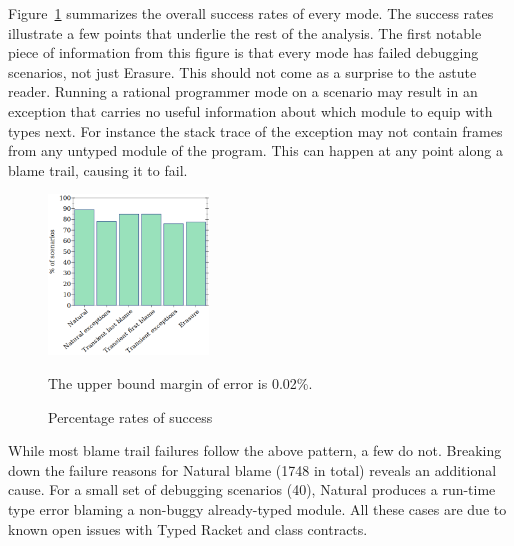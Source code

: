 
Figure~\ref{fig:success-bars} summarizes the overall success rates of
every mode.
The success rates illustrate a few points that underlie the
rest of the analysis.  The first notable piece of information from this
figure is that every mode has failed debugging scenarios, not just
Erasure. This should not come as a surprise to the astute reader.  Running
a rational programmer mode on a scenario may result in an exception
that carries no useful information about which module to equip with types next. For instance the stack trace of the exception may not
contain frames from any untyped module of the program. This can happen at any point
along a blame trail, causing it to fail.

\begin{figure} \footnotesize 
  \vspace{-1.5em}
  \includegraphics[width=0.38\textwidth]{./plots/success-bars}
  \vspace{1em}
  \begin{minipage}{0.35\textwidth} \raggedright
   The upper bound margin of error is 0.02\%.
  \end{minipage}
\vspace{-2em}
  \caption{Percentage rates of success} \label{fig:success-bars}
\end{figure}



While most blame trail failures follow the above pattern, a few do
not.  Breaking down the failure reasons for Natural blame (1748 in
total) reveals an additional cause. For a small set of debugging scenarios
(40), Natural produces a run-time type error blaming a non-buggy
already-typed module. All these cases are due to known open issues with Typed
Racket and class contracts. 

